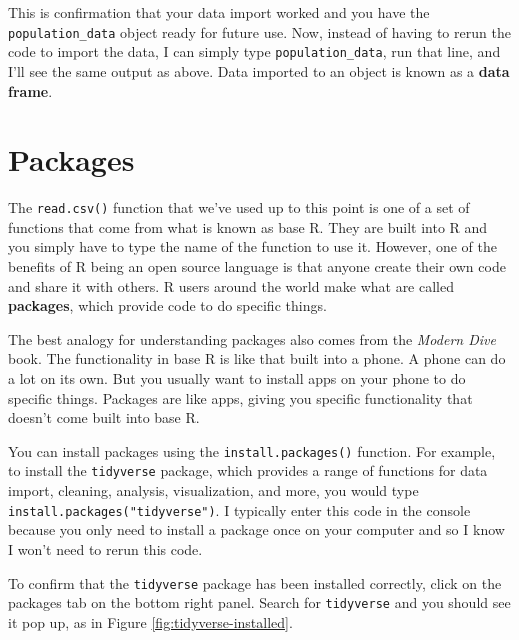 \documentclass[
]{book}
\begin{document}
This is confirmation that your data import worked and you have the \texttt{population\_data} object ready for future use. Now, instead of having to rerun the code to import the data, I can simply type \texttt{population\_data}, run that line, and I'll see the same output as above. Data imported to an object is known as a \textbf{data frame}.

\hypertarget{packages}{%
\section*{Packages}\label{packages}}

The \texttt{read.csv()} function that we've used up to this point is one of a set of functions that come from what is known as base R. They are built into R and you simply have to type the name of the function to use it. However, one of the benefits of R being an open source language is that anyone create their own code and share it with others. R users around the world make what are called \textbf{packages}, which provide code to do specific things.

The best analogy for understanding packages also comes from the \emph{Modern Dive} book. The functionality in base R is like that built into a phone. A phone can do a lot on its own. But you usually want to install apps on your phone to do specific things. Packages are like apps, giving you specific functionality that doesn't come built into base R.

You can install packages using the \texttt{install.packages()} function. For example, to install the \texttt{tidyverse} package, which provides a range of functions for data import, cleaning, analysis, visualization, and more, you would type \texttt{install.packages("tidyverse")}. I typically enter this code in the console because you only need to install a package once on your computer and so I know I won't need to rerun this code.

To confirm that the \texttt{tidyverse} package has been installed correctly, click on the packages tab on the bottom right panel. Search for \texttt{tidyverse} and you should see it pop up, as in Figure \ref{fig:tidyverse-installed}.
\end{document}

